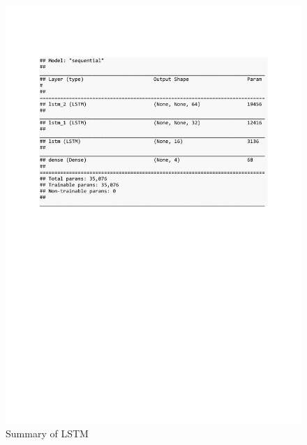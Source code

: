 \begin{figure}[h]
	\centering
	\includegraphics[scale=0.5]{Figures/summary_LSTM_pred_house_temp}
	\decoRule
	\caption[Experiment 2: Summary of LSTM for unsupervised learning]{Summary of LSTM \parencite{own}}
	\label{fig:summary_LSTM_pred_house_temp}
\end{figure}